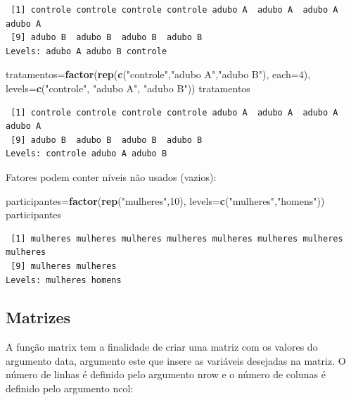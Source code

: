\documentclass[12pt,brazil,oneside]{book}
\newenvironment{Shaded}{\begin{snugshade}}{\end{snugshade}}
\newcommand{\DataTypeTok}[1]{\textcolor[rgb]{0.13,0.29,0.53}{#1}}
\newcommand{\DecValTok}[1]{\textcolor[rgb]{0.00,0.00,0.81}{#1}}
\newcommand{\KeywordTok}[1]{\textcolor[rgb]{0.13,0.29,0.53}{\textbf{#1}}}
\newcommand{\NormalTok}[1]{#1}
\newcommand{\StringTok}[1]{\textcolor[rgb]{0.31,0.60,0.02}{#1}}
\begin{document}
\begin{verbatim}
 [1] controle controle controle controle adubo A  adubo A  adubo A  adubo A 
 [9] adubo B  adubo B  adubo B  adubo B 
Levels: adubo A adubo B controle
\end{verbatim}

\begin{Shaded}
\begin{Highlighting}[]
\NormalTok{tratamentos=}\KeywordTok{factor}\NormalTok{(}\KeywordTok{rep}\NormalTok{(}\KeywordTok{c}\NormalTok{(}\StringTok{"controle"}\NormalTok{,}\StringTok{"adubo A"}\NormalTok{,}\StringTok{"adubo B"}\NormalTok{), }\DataTypeTok{each=}\DecValTok{4}\NormalTok{), }
\DataTypeTok{levels=}\KeywordTok{c}\NormalTok{(}\StringTok{"controle"}\NormalTok{, }\StringTok{"adubo A"}\NormalTok{, }\StringTok{"adubo B"}\NormalTok{))}
\NormalTok{tratamentos}
\end{Highlighting}
\end{Shaded}

\begin{verbatim}
 [1] controle controle controle controle adubo A  adubo A  adubo A  adubo A 
 [9] adubo B  adubo B  adubo B  adubo B 
Levels: controle adubo A adubo B
\end{verbatim}

Fatores podem conter níveis não usados (vazios):

\begin{Shaded}
\begin{Highlighting}[]
\NormalTok{participantes=}\KeywordTok{factor}\NormalTok{(}\KeywordTok{rep}\NormalTok{(}\StringTok{"mulheres"}\NormalTok{,}\DecValTok{10}\NormalTok{), }\DataTypeTok{levels=}\KeywordTok{c}\NormalTok{(}\StringTok{"mulheres"}\NormalTok{,}\StringTok{"homens"}\NormalTok{))}
\NormalTok{participantes}
\end{Highlighting}
\end{Shaded}

\begin{verbatim}
 [1] mulheres mulheres mulheres mulheres mulheres mulheres mulheres mulheres
 [9] mulheres mulheres
Levels: mulheres homens
\end{verbatim}

\hypertarget{matrizes}{%
\subsection{Matrizes}\label{matrizes}}

A função matrix tem a finalidade de criar uma matriz com os valores do argumento data, argumento este que insere as variáveis desejadas na matriz. O número de linhas é definido pelo argumento nrow e o número de colunas é definido pelo argumento ncol:
\end{document}
